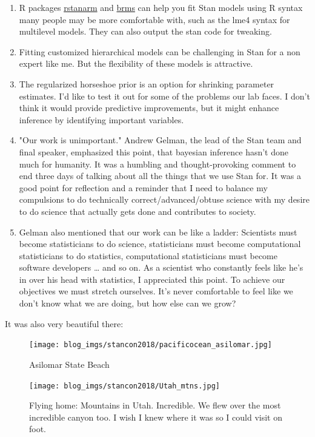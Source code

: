 \documentclass{article}
\begin{document}
\begin{enumerate}
\item R packages \href{http://mc-stan.org/users/interfaces/rstanarm}{rstanarm} and \href{https://cran.r-project.org/web/packages/brms/vignettes/brms\_overview.pdf}{brms} can help you fit Stan models using R
syntax many people may be more comfortable with, such as the lme4
syntax for multilevel models.  They can also output the stan code
for tweaking.
\item Fitting customized hierarchical models can be challenging in Stan
for a non expert like me.  But the flexibility of these models is
attractive.
\item The regularized horseshoe prior is an option for shrinking
parameter estimates.  I'd like to test it out for some of the
problems our lab faces.  I don't think it would provide predictive
improvements, but it might enhance inference by identifying
important variables.
\item "Our work is unimportant." Andrew Gelman, the lead of the Stan
team and final speaker, emphasized this point, that bayesian
inference hasn't done much for humanity.  It was a humbling and
thought-provoking comment to end three days of talking about
all the things that we use Stan for.  It was a good point for
reflection and a reminder that I need to balance my compulsions to
do technically correct/advanced/obtuse science with my desire to do
science that actually gets done and contributes to society.
\item Gelman also mentioned that our work can be like a ladder:
Scientists must become statisticians to do science, statisticians
must become computational statisticians to do statistics,
computational statisticians must become software developers \ldots{} and
so on.  As a scientist who constantly feels like he's in over his
head with statistics, I appreciated this point.  To achieve our
objectives we must stretch ourselves.  It's never comfortable to
feel like we don't know what we are doing, but how else can we grow?
\end{enumerate}

It was also very beautiful there:
\begin{figure}[htbp]
\centering
\texttt{[image: blog\_imgs/stancon2018/pacificocean\_asilomar.jpg]}
\caption{Asilomar State Beach}
\end{figure}


\begin{figure}[htbp]
\centering
\texttt{[image: blog\_imgs/stancon2018/Utah\_mtns.jpg]}
\caption{Flying home: Mountains in Utah.  Incredible.  We flew over the most incredible canyon too.  I wish I knew where it was so I could visit on foot.}
\end{figure}
\end{document}
